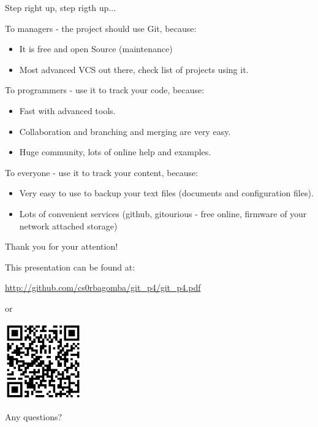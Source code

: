 \documentclass{beamer}
\begin{document}
\begin{frame}{Step right up, step rigth up...}

\begin{block}{To managers - the project should use Git, because:}
\begin{itemize}
 \item It is free and open Source (maintenance)
 \item Most advanced VCS out there, check list of projects using it.
\end{itemize}
\end{block}

\begin{block}{To programmers - use it to track your code, because:}
\begin{itemize}
 \item Fast with advanced tools.
 \item Collaboration and branching and merging are very easy.
 \item Huge community, lots of online help and examples.
\end{itemize}
\end{block}

\begin{block}{To everyone - use it to track your content, because:}
\begin{itemize}
 \item Very easy to use to backup your text files (documents and configuration files).
 \item Lots of convenient services (github, gitourious - free online, firmware of your network attached storage)
\end{itemize}
\end{block}

\end{frame}


\begin{frame}{Thank you for your attention!}

\begin{center}

This presentation can be found at:

\small
\url{http://github.com/cs0rbagomba/git_p4/git_p4.pdf}

\smallskip
or
\smallskip

\includegraphics[height=3.3cm]{barcode.png}

\smallskip

Any questions?
\end{center}

\end{frame}

\end{document}
